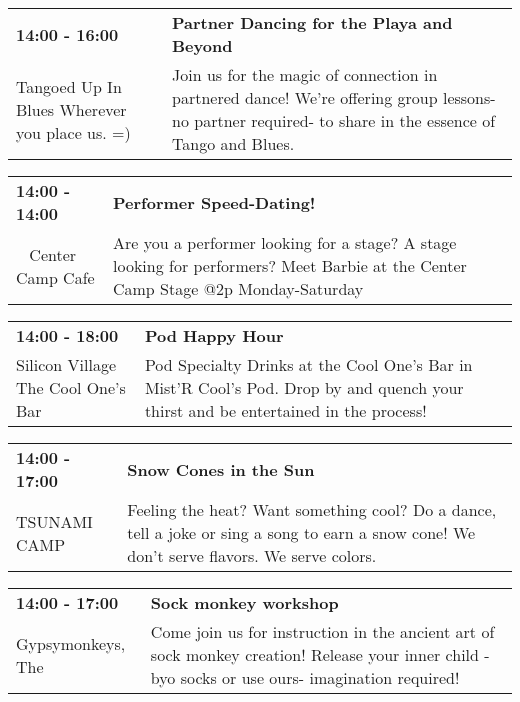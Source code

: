 \begin{tabular}{ p{1in} p{2.2in} }
    \textbf{14:00 - 16:00} & \textbf{Partner Dancing for the Playa and Beyond} \\
    Tangoed Up In Blues \newline Wherever you place us. =) & Join us for the magic of connection in partnered dance! We're offering group lessons-no partner required- to share in the essence of Tango and Blues. \\
    \hline 
\end{tabular}
    
\begin{tabular}{ p{1in} p{2.2in} }
    \textbf{14:00 - 14:00} & \textbf{Performer Speed-Dating!} \\
    ~ \newline Center Camp Cafe & Are you a performer looking for a stage? A stage looking for performers? Meet Barbie at the Center Camp Stage @2p Monday-Saturday \\
    \hline 
\end{tabular}
    
\begin{tabular}{ p{1in} p{2.2in} }
    \textbf{14:00 - 18:00} & \textbf{Pod Happy Hour} \\
    Silicon Village \newline The Cool One's Bar & Pod Specialty Drinks at the Cool One's Bar in Mist'R Cool's Pod.
Drop by and quench your thirst and be entertained in the process! \\
    \hline 
\end{tabular}
    
\begin{tabular}{ p{1in} p{2.2in} }
    \textbf{14:00 - 17:00} & \textbf{Snow Cones in the Sun} \\
    TSUNAMI CAMP \newline  & Feeling the heat?  Want something cool?
Do a dance, tell a joke or sing a song to earn a snow cone!  We don't serve flavors. We serve colors. \\
    \hline 
\end{tabular}
    
\begin{tabular}{ p{1in} p{2.2in} }
    \textbf{14:00 - 17:00} & \textbf{Sock monkey workshop} \\
    Gypsymonkeys, The \newline  & Come join us for instruction in the ancient art of sock monkey creation! Release your inner child - byo socks or use ours- imagination required! \\
    \hline 
\end{tabular}
    
